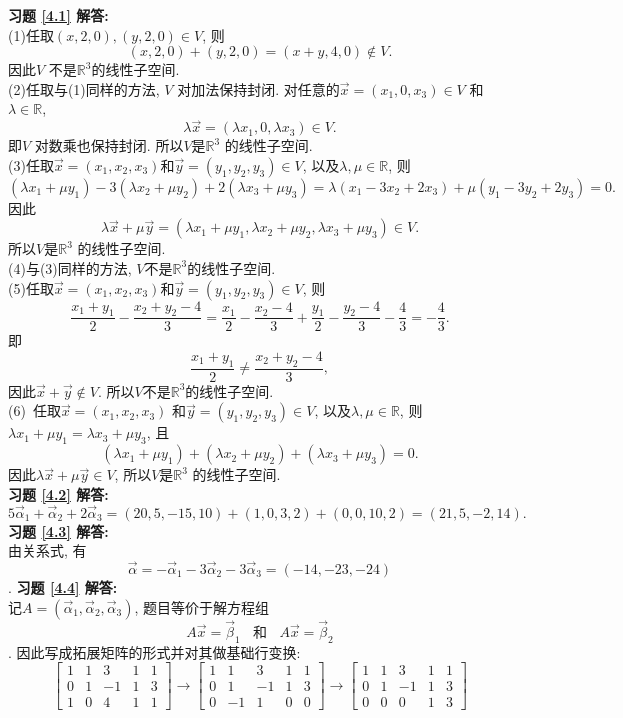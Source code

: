 \documentclass[a4paper]{book}
\begin{document}
\textbf{习题 \ref{4.1} 解答:}\\
(1)任取$(x,2,0),(y,2,0)\in V$, 则$$ (x,2,0)+(y,2,0)=(x+y,4,0)\not \in V.$$ 因此$V$ 不是$\mathbb{R}^3$的线性子空间.\\
(2)任取与(1)同样的方法, $V$ 对加法保持封闭. 对任意的$\vec{x}=(x_1,0,x_3)\in V$ 和$\lambda\in \mathbb{R}$, $$\lambda \vec{x}=(\lambda x_1,0,\lambda x_3)\in V.$$ 即$V$ 对数乘也保持封闭. 所以$V$是$\mathbb{R}^3$ 的线性子空间.\\
(3)任取$\vec{x}=(x_1,x_2,x_3)$和$\vec{y}=(y_1,y_2,y_3)\in V$, 以及$\lambda, \mu \in \mathbb{R}$, 则 $$(\lambda x_1+\mu y_1)-3(\lambda x_2+\mu y_2)+2(\lambda x_3+\mu y_3)=\lambda(x_1-3x_2+2x_3)+\mu(y_1-3y_2+2y_3)=0.$$
因此$$\lambda \vec{x}+\mu \vec{y}=(\lambda x_1+\mu y_1,\lambda x_2+\mu y_2,\lambda x_3+\mu y_3)\in V.$$ 所以$V$是$\mathbb{R}^3$ 的线性子空间.\\
(4)与(3)同样的方法, $V$不是$\mathbb{R}^3$的线性子空间.\\
(5)任取$\vec{x}=(x_1,x_2,x_3)$和$\vec{y}=(y_1,y_2,y_3)\in V$, 则$$\frac{x_1+y_1}{2}-\frac{x_2+y_2-4}{3}=\frac{x_1}{2}-\frac{x_2-4}{3}+\frac{y_1}{2}-\frac{y_2-4}{3}-\frac{4}{3}=-\frac{4}{3}.$$
即$$\frac{x_1+y_1}{2}\not =\frac{x_2+y_2-4}{3},$$ 因此$\vec{x}+\vec{y}\not\in V$. 所以$V$不是$\mathbb{R}^3$的线性子空间.\\
(6)\ 任取$\vec{x}=(x_1,x_2,x_3)$ 和$\vec{y}=(y_1,y_2,y_3)\in V$, 以及$\lambda, \mu \in \mathbb{R}$, 则$\lambda x_1+\mu y_1=\lambda x_3+\mu y_3$, 且 $$(\lambda x_1+\mu y_1)+(\lambda x_2+\mu y_2)+(\lambda x_3+\mu y_3)=0.$$ 因此$\lambda \vec{x}+\mu \vec{y}\in V$, 所以$V$是$\mathbb{R}^3$ 的线性子空间.\\
\textbf{习题 \ref{4.2} 解答:}\\
$$5\vec{\alpha}_1+\vec{\alpha}_2+2\vec{\alpha}_3=(20,5,-15,10)+(1,0,3,2)+(0,0,10,2)=(21, 5, -2, 14).$$
\textbf{习题 \ref{4.3} 解答:}\\
由关系式, 有$$\vec{\alpha}=-\vec{\alpha}_1-3\vec{\alpha}_2-3\vec{\alpha}_3=(-14,-23,-24)$$.
\textbf{习题 \ref{4.4} 解答:}\\
记$A=(\vec{\alpha}_1, \vec{\alpha}_2, \vec{\alpha}_3)$, 题目等价于解方程组$$A\vec{x}=\vec{\beta}_1\ \ \  \ \mbox{和}\ \ \ \ A\vec{x}=\vec{\beta}_2$$.
因此写成拓展矩阵的形式并对其做基础行变换:
\begin{displaymath}
\left[\begin{array}{ccccc}1 & 1 & 3 & 1 & 1 \\ 0 & 1 &-1 & 1 & 3\\ 1 & 0 & 4 & 1 & 1 \end{array}\right]\longrightarrow \left[\begin{array}{ccccc}1 & 1 & 3 & 1 & 1 \\ 0 & 1 &-1 & 1 & 3\\ 0 & -1 & 1 & 0 & 0 \end{array}\right]\longrightarrow
\left[\begin{array}{ccccc}1 & 1 & 3 & 1 & 1 \\ 0 & 1 &-1 & 1 & 3\\ 0 & 0 & 0 & 1 & 3 \end{array}\right]\end{displaymath}
\end{document}
